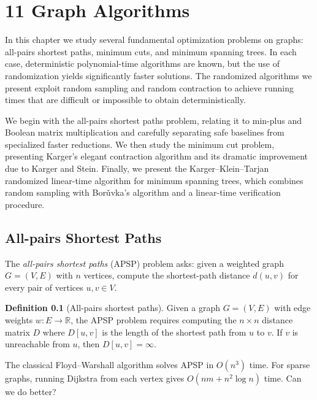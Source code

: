 \documentclass[twoside,12pt]{book}
\theoremstyle{plain}
\theoremstyle{definition}
\newtheorem{definition}[theorem]{Definition}
\theoremstyle{remark}
\begin{document}
\chapter*{11 Graph Algorithms}
\label{ch:graph-algorithms}

In this chapter we study several fundamental optimization problems on graphs: all-pairs shortest paths, minimum cuts, and minimum spanning trees. In each case, deterministic polynomial-time algorithms are known, but the use of randomization yields significantly faster solutions. The randomized algorithms we present exploit random sampling and random contraction to achieve running times that are difficult or impossible to obtain deterministically.

We begin with the all-pairs shortest paths problem, relating it to min-plus
and Boolean matrix multiplication and carefully separating safe baselines from
specialized faster reductions. We then study the minimum cut problem,
presenting Karger's elegant contraction algorithm and its dramatic improvement
due to Karger and Stein. Finally, we present the Karger--Klein--Tarjan
randomized linear-time algorithm for minimum spanning trees, which combines
random sampling with Bor\v{u}vka's algorithm and a linear-time verification
procedure.

\section{All-pairs Shortest Paths}
\label{sec:apsp}

The \emph{all-pairs shortest paths} (APSP) problem asks: given a weighted graph $G = (V, E)$ with $n$ vertices, compute the shortest-path distance $d(u, v)$ for every pair of vertices $u, v \in V$.

\begin{definition}[All-pairs shortest paths]
Given a graph $G = (V, E)$ with edge weights $w: E \to \mathbb{R}$, the APSP problem requires computing the $n \times n$ distance matrix $D$ where $D[u, v]$ is the length of the shortest path from $u$ to $v$. If $v$ is unreachable from $u$, then $D[u, v] = \infty$.
\end{definition}

The classical Floyd--Warshall algorithm solves APSP in $O(n^3)$ time. For sparse graphs, running Dijkstra from each vertex gives $O(nm + n^2 \log n)$ time. Can we do better?
\end{document}
